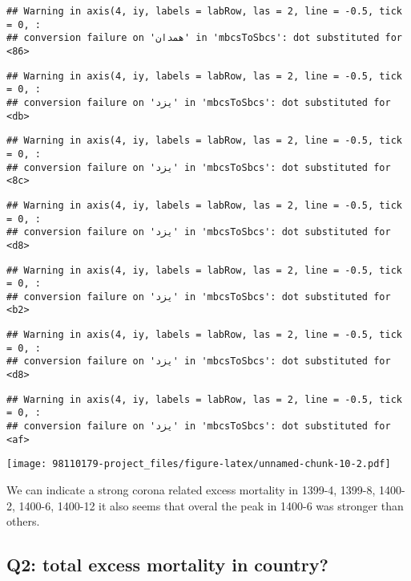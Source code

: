 \documentclass[
]{article}
\begin{document}
\begin{verbatim}
## Warning in axis(4, iy, labels = labRow, las = 2, line = -0.5, tick = 0, :
## conversion failure on 'همدان' in 'mbcsToSbcs': dot substituted for <86>
\end{verbatim}

\begin{verbatim}
## Warning in axis(4, iy, labels = labRow, las = 2, line = -0.5, tick = 0, :
## conversion failure on 'یزد' in 'mbcsToSbcs': dot substituted for <db>
\end{verbatim}

\begin{verbatim}
## Warning in axis(4, iy, labels = labRow, las = 2, line = -0.5, tick = 0, :
## conversion failure on 'یزد' in 'mbcsToSbcs': dot substituted for <8c>
\end{verbatim}

\begin{verbatim}
## Warning in axis(4, iy, labels = labRow, las = 2, line = -0.5, tick = 0, :
## conversion failure on 'یزد' in 'mbcsToSbcs': dot substituted for <d8>
\end{verbatim}

\begin{verbatim}
## Warning in axis(4, iy, labels = labRow, las = 2, line = -0.5, tick = 0, :
## conversion failure on 'یزد' in 'mbcsToSbcs': dot substituted for <b2>
\end{verbatim}

\begin{verbatim}
## Warning in axis(4, iy, labels = labRow, las = 2, line = -0.5, tick = 0, :
## conversion failure on 'یزد' in 'mbcsToSbcs': dot substituted for <d8>
\end{verbatim}

\begin{verbatim}
## Warning in axis(4, iy, labels = labRow, las = 2, line = -0.5, tick = 0, :
## conversion failure on 'یزد' in 'mbcsToSbcs': dot substituted for <af>
\end{verbatim}

\texttt{[image: 98110179-project\_files/figure-latex/unnamed-chunk-10-2.pdf]}

We can indicate a strong corona related excess mortality in 1399-4,
1399-8, 1400-2, 1400-6, 1400-12 it also seems that overal the peak in
1400-6 was stronger than others.

\hypertarget{q2-total-excess-mortality-in-country}{%
\subsection{Q2: total excess mortality in
country?}\label{q2-total-excess-mortality-in-country}}
\end{document}

